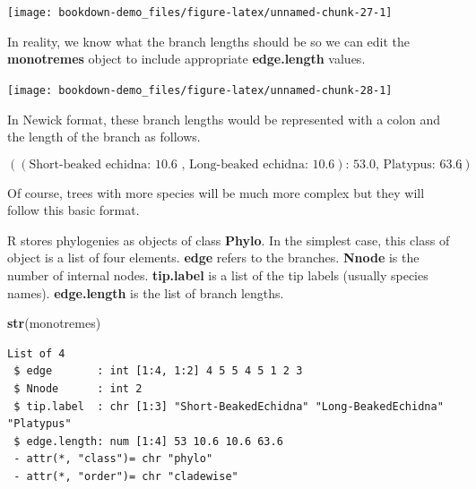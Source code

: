 \documentclass[
]{book}
\newenvironment{Shaded}{\begin{snugshade}}{\end{snugshade}}
\newcommand{\DataTypeTok}[1]{\textcolor[rgb]{0.13,0.29,0.53}{#1}}
\newcommand{\DecValTok}[1]{\textcolor[rgb]{0.00,0.00,0.81}{#1}}
\newcommand{\FloatTok}[1]{\textcolor[rgb]{0.00,0.00,0.81}{#1}}
\newcommand{\KeywordTok}[1]{\textcolor[rgb]{0.13,0.29,0.53}{\textbf{#1}}}
\newcommand{\NormalTok}[1]{#1}
\newcommand{\OperatorTok}[1]{\textcolor[rgb]{0.81,0.36,0.00}{\textbf{#1}}}
\newcommand{\StringTok}[1]{\textcolor[rgb]{0.31,0.60,0.02}{#1}}
\begin{document}
\begin{center}\texttt{[image: bookdown-demo\_files/figure-latex/unnamed-chunk-27-1]} \end{center}

In reality, we know what the branch lengths should be so we can edit the \textbf{monotremes} object to include appropriate \textbf{edge.length} values.

\begin{Shaded}
\end{Shaded}

\begin{center}\texttt{[image: bookdown-demo\_files/figure-latex/unnamed-chunk-28-1]} \end{center}

In Newick format, these branch lengths would be represented with a colon and the length of the branch as follows.

\[ ((\text{Short-beaked echidna: 10.6 , Long-beaked echidna: 10.6})\text{: 53.0, Platypus: 63.6}); \]

Of course, trees with more species will be much more complex but they will follow this basic format.

R stores phylogenies as objects of class \textbf{Phylo}. In the simplest case, this class of object is a list of four elements. \textbf{edge} refers to the branches. \textbf{Nnode} is the number of internal nodes. \textbf{tip.label} is a list of the tip labels (usually species names). \textbf{edge.length} is the list of branch lengths.

\begin{Shaded}
\begin{Highlighting}[]
\KeywordTok{str}\NormalTok{(monotremes)}
\end{Highlighting}
\end{Shaded}

\begin{verbatim}
List of 4
 $ edge       : int [1:4, 1:2] 4 5 5 4 5 1 2 3
 $ Nnode      : int 2
 $ tip.label  : chr [1:3] "Short-BeakedEchidna" "Long-BeakedEchidna" "Platypus"
 $ edge.length: num [1:4] 53 10.6 10.6 63.6
 - attr(*, "class")= chr "phylo"
 - attr(*, "order")= chr "cladewise"
\end{verbatim}
\end{document}
